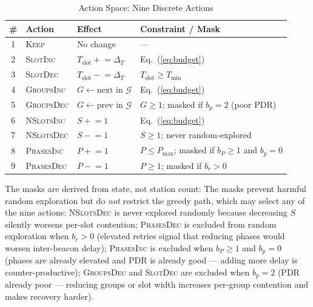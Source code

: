 \documentclass[conference]{IEEEtran}
\begin{document}
\begin{table}[h]
\centering
\caption{Action Space: Nine Discrete Actions}
\label{tab:actions}
{\scriptsize
\begin{tabular}{clll}
\toprule
\# & Action & Effect & Constraint / Mask \\
\midrule
1 & \textsc{Keep}       & No change                                   & — \\
2 & \textsc{SlotInc}    & $T_\text{slot} \mathrel{+}= \Delta_T$       & Eq.~(\ref{eq:budget}) \\
3 & \textsc{SlotDec}    & $T_\text{slot} \mathrel{-}= \Delta_T$       & $T_\text{slot}\geq T_\text{min}$ \\
4 & \textsc{GroupsInc}  & $G\leftarrow\text{next in }\mathcal{G}$     & Eq.~(\ref{eq:budget}) \\
5 & \textsc{GroupsDec}  & $G\leftarrow\text{prev in }\mathcal{G}$     & $G\geq 1$; masked if $b_p=2$ (poor PDR) \\
6 & \textsc{NSlotsInc}  & $S \mathrel{+}= 1$                          & Eq.~(\ref{eq:budget}) \\
7 & \textsc{NSlotsDec}  & $S \mathrel{-}= 1$                          & $S\geq 1$; never random-explored \\
8 & \textsc{PhasesInc}  & $P \mathrel{+}= 1$                          & $P\leq P_\text{max}$; masked if $b_P\!\geq\!1$ and $b_p\!=\!0$ \\
9 & \textsc{PhasesDec}  & $P \mathrel{-}= 1$                          & $P\geq 1$; masked if $b_r>0$ \\
\bottomrule
\end{tabular}
}
\end{table}

The masks are derived from state, not station count:
The masks prevent harmful random exploration but do \emph{not} restrict
the greedy path, which may select any of the nine actions:
\textsc{NSlotsDec} is never explored randomly because decreasing $S$
silently worsens per-slot contention;
\textsc{PhasesDec} is excluded from random exploration when $b_r > 0$
(elevated retries signal that reducing phases would worsen inter-beacon
delay);
\textsc{PhasesInc} is excluded when $b_P\!\geq\!1$ and $b_p\!=\!0$
(phases are already elevated and PDR is already good — adding more delay is
counter-productive);
\textsc{GroupsDec} and \textsc{SlotDec} are excluded when $b_p = 2$
(PDR already poor — reducing groups or slot width increases per-group
contention and makes recovery harder).
\end{document}
